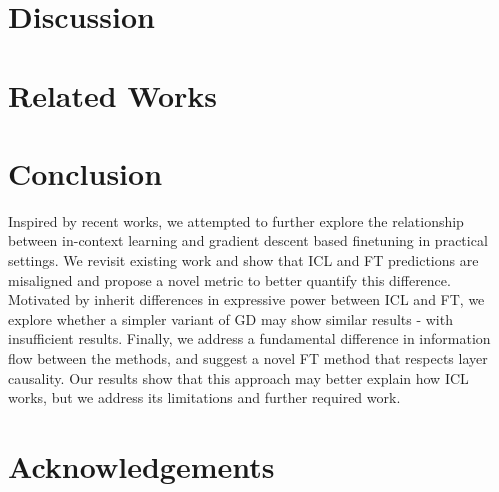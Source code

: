 \documentclass[11pt]{article}
\begin{document}
\section{Discussion}


\section{Related Works} \label{sec:related}


\section{Conclusion}
Inspired by recent works, we attempted to further explore the relationship between in-context learning and gradient descent based finetuning in practical settings.
We revisit existing work and show that ICL and FT predictions are misaligned and propose a novel metric to better quantify this difference.
Motivated by inherit differences in expressive power between ICL and FT, we explore whether a simpler variant of GD may show similar results - with insufficient results.
Finally, we address a fundamental difference in information flow between the methods, and suggest a novel FT method that respects layer causality.
Our results show that this approach may better explain how ICL works, but we address its limitations and further required work.
\section{Acknowledgements}





\newpage
\appendix
\end{document}
